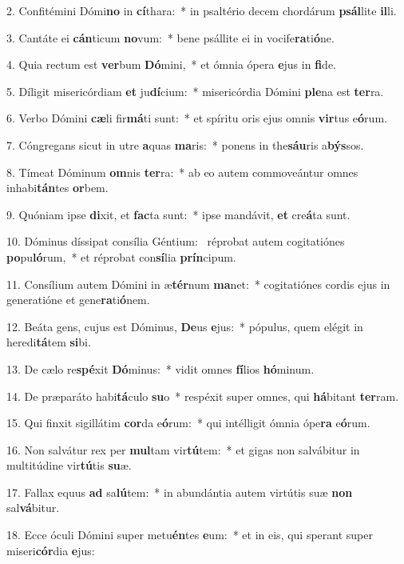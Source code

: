 2. Confitémini Dómi\textbf{no} in \textbf{cí}thara:~*  in psaltério decem chordárum \textbf{psál}lite \textbf{il}li.\

3. Cantáte ei \textbf{cán}ticum \textbf{no}vum:~*  bene psállite ei in vocife\textbf{ra}ti\textbf{ó}ne.\

4. Quia rectum est \textbf{ver}bum \textbf{Dó}mini,~*  et ómnia ópera \textbf{e}jus in \textbf{fi}de.\

5. Díligit misericórdiam \textbf{et} ju\textbf{dí}cium:~*  misericórdia Dómini \textbf{ple}na est \textbf{ter}ra.\

6. Verbo Dómini \textbf{cæ}li fir\textbf{má}ti sunt:~*  et spíritu oris ejus omnis \textbf{vir}tus e\textbf{ó}rum.\

7. Cóngregans sicut in utre \textbf{a}quas \textbf{ma}ris:~*  ponens in the\textbf{sáu}ris a\textbf{býs}sos.\

8. Tímeat Dóminum \textbf{om}nis \textbf{ter}ra:~*  ab eo autem commoveántur omnes inhabi\textbf{tán}tes \textbf{or}bem.\

9. Quóniam ipse \textbf{di}xit, et \textbf{fac}ta sunt:~*  ipse mandávit, \textbf{et} cre\textbf{á}ta sunt.\

10. Dóminus díssipat consília Géntium: \dag\  réprobat autem cogitatiónes \textbf{po}pu\textbf{ló}rum,~*  et réprobat con\textbf{sí}lia \textbf{prín}cipum.\

11. Consílium autem Dómini in æ\textbf{tér}num \textbf{ma}net:~*  cogitatiónes cordis ejus in generatióne et gene\textbf{ra}ti\textbf{ó}nem.\

12. Beáta gens, cujus est Dóminus, \textbf{De}us \textbf{e}jus:~*  pópulus, quem elégit in heredi\textbf{tá}tem \textbf{si}bi.\

13. De cælo re\textbf{spé}xit \textbf{Dó}minus:~*  vidit omnes \textbf{fí}lios \textbf{hó}minum.\

14. De præparáto habi\textbf{tá}culo \textbf{su}o~*  respéxit super omnes, qui \textbf{há}bitant \textbf{ter}ram.\

15. Qui finxit sigillátim \textbf{cor}da e\textbf{ó}rum:~*  qui intélligit ómnia ópe\textbf{ra} e\textbf{ó}rum.\

16. Non salvátur rex per \textbf{mul}tam vir\textbf{tú}tem:~*  et gigas non salvábitur in multitúdine vir\textbf{tú}tis \textbf{su}æ.\

17. Fallax equus \textbf{ad} sa\textbf{lú}tem:~*  in abundántia autem virtútis suæ \textbf{non} sal\textbf{vá}bitur.\

18. Ecce óculi Dómini super metu\textbf{én}tes \textbf{e}um:~*  et in eis, qui sperant super miseri\textbf{cór}dia \textbf{e}jus:\

